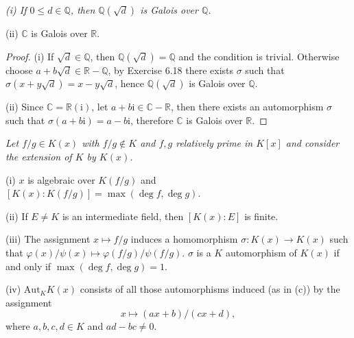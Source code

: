 \begin{problem}\em
(i) If $0\leq d\in \mathbb{Q}$, then $\mathbb{Q}(\sqrt{d})$ is Galois over $\mathbb{Q}$.\par
(ii) $\mathbb{C}$ is Galois over $\mathbb{R}$.
\end{problem}
\begin{proof}
(i) If $\sqrt{d}\in\mathbb{Q}$, then $\mathbb{Q}(\sqrt{d})=\mathbb{Q}$ and the condition is trivial. Otherwise choose $a+b\sqrt{d}\in\mathbb{R}-\mathbb{Q}$, by Exercise 6.18 there exists $\sigma$ such that $\sigma(x+y\sqrt{d})=x-y\sqrt{d}$, hence $\mathbb{Q}(\sqrt{d})$ is Galois over $\mathbb{Q}$.\par
(ii) Since $\mathbb{C}=\mathbb{R}(\mathrm{i})$, let $a+b\mathrm{i}\in\mathbb{C}-\mathbb{R}$, then there exists an automorphism $\sigma$ such that $\sigma(a+b\mathrm{i})=a-b\mathrm{i}$, therefore $\mathbb{C}$ is Galois over $\mathbb{R}$.
\end{proof}
\begin{problem}\em
Let $f/g\in K(x)$ with $f/g\notin K$ and $f, g$ relatively prime in $K[x]$ and consider the extension of $K$ by $K(x)$.\par
(i) $x$ is algebraic over $K(f/g)$ and $[K(x):K(f/g)]=\max{(\deg{f}, \deg{g})}$.\par
(ii) If $E\neq K$ is an intermediate field, then $[K(x):E]$ is finite.\par
(iii) The assignment $x\mapsto f/g$ induces a homomorphism $\sigma:K(x)\to K(x)$ such that $\varphi(x)/\psi(x)\mapsto \varphi(f/g)/\psi(f/g)$. $\sigma$ is a $K$ automorphism of $K(x)$ if and only if $\max{(\deg{f}, \deg{g})}=1$.\par
(iv) $\mathrm{Aut}_K K(x)$ consists of all those automorphisms induced (as in (c)) by the assignment
$$x\mapsto (ax+b)/(cx+d),$$
where $a, b, c, d\in K$ and $ad-bc\neq 0$.
\end{problem}
